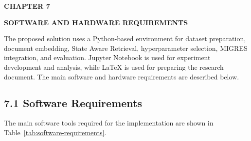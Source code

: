 \documentclass[12pt,a4paper]{report}
\newcommand{\chaptertitle}[2]{
    \begin{center}
        {\fontsize{18}{21}\selectfont\bfseries CHAPTER #1\par}
        \vspace{0.10in}
        {\fontsize{18}{21}\selectfont\bfseries #2\par}
    \end{center}
    \vspace{0.12in}
}
\begin{document}
\label{ch:6:end}

\clearpage


\setcounter{table}{0}
\renewcommand{\thetable}{7.\arabic{table}}


\chaptertitle{7}{SOFTWARE AND HARDWARE REQUIREMENTS}
\label{ch:7}

\justifying

The proposed solution uses a Python-based environment for dataset
preparation, document embedding, State Aware Retrieval, hyperparameter
selection, MIGRES integration, and evaluation. Jupyter Notebook is used
for experiment development and analysis, while LaTeX is used for
preparing the research document. The main software and hardware
requirements are described below.

\subsection*{7.1 Software Requirements}

The main software tools required for the implementation are shown in
Table~\ref{tab:software-requirements}.
\end{document}

